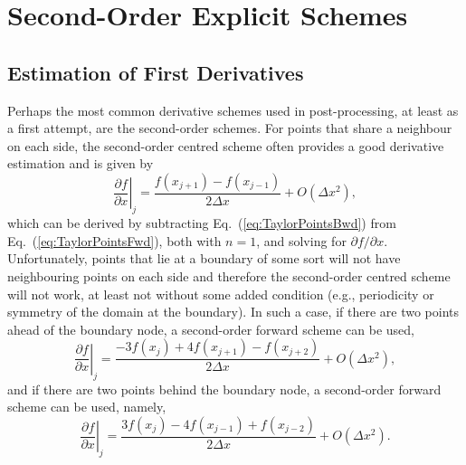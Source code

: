 \documentclass[10pt, twoside]{book}
\begin{document}
		\section{\label{sec:Order2FD}Second-Order Explicit Schemes}
			
			\subsection{\label{sec:O2FDD1}Estimation of First Derivatives}
				
				Perhaps the most common derivative schemes used in post-processing, at least as a first attempt, are the second-order schemes. For points that share a neighbour on each side, the second-order centred scheme often provides a good derivative estimation and is given by
				\begin{equation}
				\label{eq:SecondOrderCentreD1}
					\left.\frac{\partial f}{\partial x}\right|_j = \frac{f\left(x_{j+1}\right) - f\left(x_{j-1}\right)}{2{\Delta}x} + O\left({\Delta}x^2\right),
				\end{equation}
				which can be derived by subtracting Eq.~(\ref{eq:TaylorPointsBwd}) from Eq.~(\ref{eq:TaylorPointsFwd}), both with $n = 1$, and solving for $\partial f/\partial x$. Unfortunately, points that lie at a boundary of some sort will not have neighbouring points on each side and therefore the second-order centred scheme will not work, at least not without some added condition (e.g., periodicity or symmetry of the domain at the boundary). In such a case, if there are two points ahead of the boundary node, a second-order forward scheme can be used,
				\begin{equation}
				\label{eq:SecondOrderFwdD1}
					\left.\frac{\partial f}{\partial x}\right|_j = \frac{-3f\left(x_{j}\right) + 4f\left(x_{j+1}\right) - f\left(x_{j+2}\right)}{2{\Delta}x} + O\left({\Delta}x^2\right),
				\end{equation}
				and if there are two points behind the boundary node, a second-order forward scheme can be used, namely,
				\begin{equation}
				\label{eq:SecondOrderBwdD1}
					\left.\frac{\partial f}{\partial x}\right|_j = \frac{3f\left(x_{j}\right) - 4f\left(x_{j-1}\right) + f\left(x_{j-2}\right)}{2{\Delta}x} + O\left({\Delta}x^2\right).
				\end{equation}
				
\end{document}
